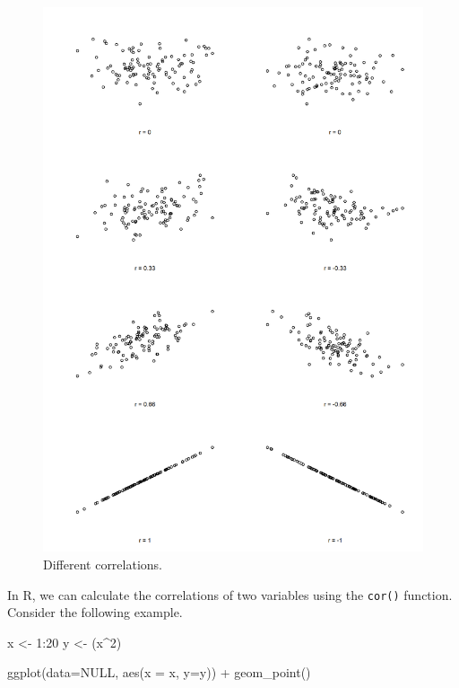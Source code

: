 \documentclass[
]{book}
\newenvironment{Shaded}{\begin{snugshade}}{\end{snugshade}}
\newcommand{\AttributeTok}[1]{\textcolor[rgb]{0.77,0.63,0.00}{#1}}
\newcommand{\ConstantTok}[1]{\textcolor[rgb]{0.00,0.00,0.00}{#1}}
\newcommand{\DecValTok}[1]{\textcolor[rgb]{0.00,0.00,0.81}{#1}}
\newcommand{\FunctionTok}[1]{\textcolor[rgb]{0.00,0.00,0.00}{#1}}
\newcommand{\NormalTok}[1]{#1}
\newcommand{\OtherTok}[1]{\textcolor[rgb]{0.56,0.35,0.01}{#1}}
\newcommand{\SpecialCharTok}[1]{\textcolor[rgb]{0.00,0.00,0.00}{#1}}
\begin{document}
\begin{figure}
\centering
\includegraphics{./img/corr-1.png}
\caption{\label{fig:correlations}Different correlations.}
\end{figure}

In R, we can calculate the correlations of two variables using the \texttt{cor()} function. Consider the following example.

\begin{Shaded}
\begin{Highlighting}[]
\NormalTok{x }\OtherTok{\textless{}{-}} \DecValTok{1}\SpecialCharTok{:}\DecValTok{20}
\NormalTok{y }\OtherTok{\textless{}{-}}\NormalTok{ (x}\SpecialCharTok{\^{}}\DecValTok{2}\NormalTok{)}

\FunctionTok{ggplot}\NormalTok{(}\AttributeTok{data=}\ConstantTok{NULL}\NormalTok{, }\FunctionTok{aes}\NormalTok{(}\AttributeTok{x =}\NormalTok{ x, }\AttributeTok{y=}\NormalTok{y)) }\SpecialCharTok{+}
  \FunctionTok{geom\_point}\NormalTok{()}
\end{Highlighting}
\end{Shaded}
\end{document}
